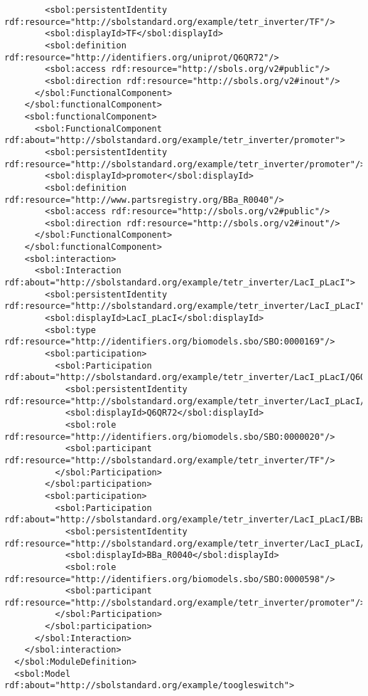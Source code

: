 \begin{lstlisting}
        <sbol:persistentIdentity rdf:resource="http://sbolstandard.org/example/tetr_inverter/TF"/>
        <sbol:displayId>TF</sbol:displayId>
        <sbol:definition rdf:resource="http://identifiers.org/uniprot/Q6QR72"/>
        <sbol:access rdf:resource="http://sbols.org/v2#public"/>
        <sbol:direction rdf:resource="http://sbols.org/v2#inout"/>
      </sbol:FunctionalComponent>
    </sbol:functionalComponent>
    <sbol:functionalComponent>
      <sbol:FunctionalComponent rdf:about="http://sbolstandard.org/example/tetr_inverter/promoter">
        <sbol:persistentIdentity rdf:resource="http://sbolstandard.org/example/tetr_inverter/promoter"/>
        <sbol:displayId>promoter</sbol:displayId>
        <sbol:definition rdf:resource="http://www.partsregistry.org/BBa_R0040"/>
        <sbol:access rdf:resource="http://sbols.org/v2#public"/>
        <sbol:direction rdf:resource="http://sbols.org/v2#inout"/>
      </sbol:FunctionalComponent>
    </sbol:functionalComponent>
    <sbol:interaction>
      <sbol:Interaction rdf:about="http://sbolstandard.org/example/tetr_inverter/LacI_pLacI">
        <sbol:persistentIdentity rdf:resource="http://sbolstandard.org/example/tetr_inverter/LacI_pLacI"/>
        <sbol:displayId>LacI_pLacI</sbol:displayId>
        <sbol:type rdf:resource="http://identifiers.org/biomodels.sbo/SBO:0000169"/>
        <sbol:participation>
          <sbol:Participation rdf:about="http://sbolstandard.org/example/tetr_inverter/LacI_pLacI/Q6QR72">
            <sbol:persistentIdentity rdf:resource="http://sbolstandard.org/example/tetr_inverter/LacI_pLacI/Q6QR72"/>
            <sbol:displayId>Q6QR72</sbol:displayId>
            <sbol:role rdf:resource="http://identifiers.org/biomodels.sbo/SBO:0000020"/>
            <sbol:participant rdf:resource="http://sbolstandard.org/example/tetr_inverter/TF"/>
          </sbol:Participation>
        </sbol:participation>
        <sbol:participation>
          <sbol:Participation rdf:about="http://sbolstandard.org/example/tetr_inverter/LacI_pLacI/BBa_R0040">
            <sbol:persistentIdentity rdf:resource="http://sbolstandard.org/example/tetr_inverter/LacI_pLacI/BBa_R0040"/>
            <sbol:displayId>BBa_R0040</sbol:displayId>
            <sbol:role rdf:resource="http://identifiers.org/biomodels.sbo/SBO:0000598"/>
            <sbol:participant rdf:resource="http://sbolstandard.org/example/tetr_inverter/promoter"/>
          </sbol:Participation>
        </sbol:participation>
      </sbol:Interaction>
    </sbol:interaction>
  </sbol:ModuleDefinition>
  <sbol:Model rdf:about="http://sbolstandard.org/example/toogleswitch">

\end{lstlisting}
